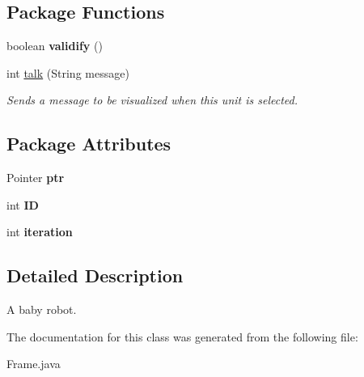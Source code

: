 \subsection*{Package Functions}
\begin{DoxyCompactItemize}
\item 
\hypertarget{classFrame_a1705d796a69b7ee777a6c7187ebdfbba}{
boolean {\bfseries validify} ()}
\label{classFrame_a1705d796a69b7ee777a6c7187ebdfbba}

\item 
\hypertarget{classFrame_a4932503ee86624433ff3475c9a3f0c5d}{
int \hyperlink{classFrame_a4932503ee86624433ff3475c9a3f0c5d}{talk} (String message)}
\label{classFrame_a4932503ee86624433ff3475c9a3f0c5d}

\begin{DoxyCompactList}\small\item\em Sends a message to be visualized when this unit is selected. \item\end{DoxyCompactList}\end{DoxyCompactItemize}
\subsection*{Package Attributes}
\begin{DoxyCompactItemize}
\item 
\hypertarget{classFrame_af3aed029f61190680a0cedbd2cbdde9c}{
Pointer {\bfseries ptr}}
\label{classFrame_af3aed029f61190680a0cedbd2cbdde9c}

\item 
\hypertarget{classFrame_a9a8d3de2300c27f2ab32341392c24416}{
int {\bfseries ID}}
\label{classFrame_a9a8d3de2300c27f2ab32341392c24416}

\item 
\hypertarget{classFrame_a9a5037560764dff9656616f337902ea8}{
int {\bfseries iteration}}
\label{classFrame_a9a5037560764dff9656616f337902ea8}

\end{DoxyCompactItemize}


\subsection{Detailed Description}
A baby robot. 

The documentation for this class was generated from the following file:\begin{DoxyCompactItemize}
\item 
Frame.java\end{DoxyCompactItemize}
